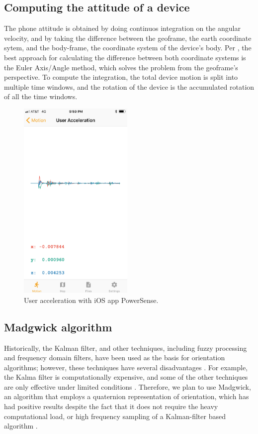 \documentclass[journal]{IEEEtranTIE}
\begin{document}
\subsection{Computing the attitude of a device}

The phone attitude is obtained by doing continuos integration on the angular
velocity, and by taking the difference between the geoframe, the earth
coordinate sytem, and the body-frame, the coordinate system of the device's
body. Per \cite{PhoneAttitude}, the best approach for calculating the difference
between both coordinate systems is the Euler Axis/Angle method, which solves the
problem from the geoframe's perspective. To compute the integration, the total
device motion is split into multiple time windows, and the rotation of the
device is the accumulated rotation of all the time windows.

\begin{figure}[!t]\centering
	\includegraphics[width=5.5cm]{acceleration}
	\caption{User acceleration with iOS app PowerSense.}\label{fig:fig2}
\end{figure}

\subsection{Madgwick algorithm}

Historically, the Kalman filter, and other techniques, including fuzzy
processing and frequency domain filters, have been used as the basis for
orientation algorithms; however, these techniques have several disadvantages
\cite{Madgwick}. For example, the Kalma filter is computationally expensive,
and some of the other techniques are only effective under limited conditions
\cite{Madgwick}. Therefore, we plan to use Madgwick, an algorithm that employs a
quaternion representation of orientation, which has had positive results despite
the fact that it does not require the heavy computational load, or high
frequency sampling of a Kalman-filter based algorithm \cite{Madgwick}.
\end{document}
